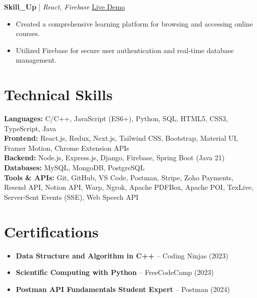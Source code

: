 \documentclass[a4paper,10pt]{article}
\begin{document}
\textbf{Skill\_Up} | \textit{React, Firebase} \hfill \href{https://abhishek6827.github.io/Skill_Up/}{Live Demo}
\begin{itemize}[leftmargin=0.15in, label={-}]
    \item Created a comprehensive learning platform for browsing and accessing online courses.
    \item Utilized Firebase for secure user authentication and real-time database management.
\end{itemize}

\section{Technical Skills}
\textbf{Languages:} C/C++, JavaScript (ES6+), Python, SQL, HTML5, CSS3, TypeScript, Java \\
\textbf{Frontend:} React.js, Redux, Next.js, Tailwind CSS, Bootstrap, Material UI, Framer Motion, Chrome Extension APIs \\
\textbf{Backend:} Node.js, Express.js, Django, Firebase, Spring Boot (Java 21) \\
\textbf{Databases:} MySQL, MongoDB, PostgreSQL \\
\textbf{Tools \& APIs:} Git, GitHub, VS Code, Postman, Stripe, Zoho Payments, Resend API, Notion API, Warp, Ngrok, Apache PDFBox, Apache POI, TexLive, Server-Sent Events (SSE), Web Speech API

\section{Certifications}
\begin{itemize}[leftmargin=0.15in, label={-}]
    \item \textbf{Data Structure and Algorithm in C++} -- Coding Ninjas (2023)
    \item \textbf{Scientific Computing with Python} -- FreeCodeCamp (2023)
    \item \textbf{Postman API Fundamentals Student Expert} -- Postman (2024)
\end{itemize}
\end{document}
